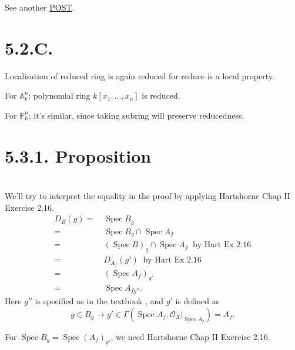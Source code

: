 See another \href{https://math.stackexchange.com/questions/1157904/functions-on-reduced-schemes-are-determined-by-their-values-at-each-point}{POST}.

\section{5.2.C.}

Localisation of reduced ring is again reduced for reduce is a local property. 

For $\mathbb A^n_k$: 
polynomial ring $k[x_1,...,x_n]$ is reduced.

For $\mathbb P^n_k$: it's similar, since taking subring will preserve reducedness.

\section{5.3.1. Proposition}

\section{}
We'll try to interpret the equality in the proof by applying Hartshorne \cite{hartshorne2013algebraic} Chap II Exercise 2.16.
\begin{align*}
	D_B(g)=&~ \operatorname{Spec}B_g\\
	=&~ \operatorname{Spec}B_g\cap \operatorname{Spec}A_f\\
	=&~ (\operatorname{Spec}B)_g \cap \operatorname{Spec}A_f ~\text{ by Hart Ex 2.16}\\
	=&~ D_{A_f}(g') ~\text{ by Hart Ex 2.16}\\
	=&~ (\operatorname{Spec}A_f)_{g'}\\
	=&~ \operatorname{Spec}A_{fg''}.
\end{align*}
Here $g''$ is specified as in the textbook \cite{RaviRisingSea}, and $g'$ is defined as \[g\in B_g\to g'\in\Gamma(\operatorname{Spec}A_f,\mathcal O_X\vert_{\operatorname{Spec}A_f})=A_f.\]

For $\operatorname{Spec} B_g=\operatorname{Spec}(A_f)_{g'}$, we need \cite{hartshorne2013algebraic} Hartshorne Chap II Exercise 2.16. 

\begin{comment}
See this \href{https://youtu.be/EWnhf0BdAWA?si=zMjtGhr12HSCjzNr}{VIDEO}, this \href{https://math.stackexchange.com/questions/384137/intersection-of-open-affines-can-be-covered-by-open-sets-distinguished-in-both}{POST}.

See \href{http://mathbabysteps.blogspot.com/2016/12/affine-communication-lemma.html}{POST}, \href{https://math.stackexchange.com/questions/4146296/declaremathoperator-specspecdoubt-about-nikes-lemma-about-the-intersecti}{POST}.
\end{comment}

